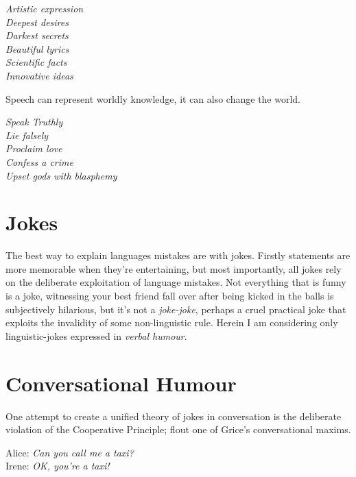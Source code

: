 \noindent


\begin{center}
\textit{Artistic expression
\\Deepest desires
\\Darkest secrets
\\Beautiful lyrics
\\Scientific facts
\\Innovative ideas}
\end{center}

Speech can represent worldly knowledge, it can also change the world.

\begin{center}
\textit{Speak Truthly
\\Lie falsely
\\Proclaim love
\\Confess a crime
\\Upset gods with blasphemy}
\end{center}




\section{Jokes}

The best way to explain languages mistakes are with jokes. Firstly statements are more memorable when they're entertaining, but most importantly, all jokes rely on the deliberate exploitation of language mistakes. Not everything that is funny is a joke, witnessing your best friend fall over after being kicked in the balls is subjectively hilarious, but it's not a \textit{joke-joke}, perhaps a cruel practical joke that exploits the invalidity of some non-linguistic rule. Herein I am considering only linguistic-jokes expressed in \textit{verbal humour}.

\section{Conversational Humour}
One attempt to create a unified theory of jokes in conversation is the deliberate violation of the Cooperative Principle; flout one of Grice's conversational maxims.

\begin{center}
    Alice: \textit{Can you call me a taxi?}
    \\ Irene: \textit{OK, you're a taxi!}
\end{center}

